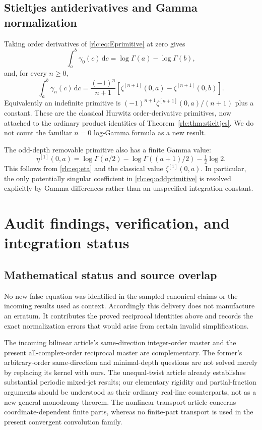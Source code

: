 \documentclass[11pt,a4paper]{article}
\numberwithin{equation}{section}
\theoremstyle{definition}\newtheorem{definition}[theorem]{Definition}
\theoremstyle{remark}\newtheorem{remark}[theorem]{Remark}
\newcommand{\dd}{\,\mathrm d}
\begin{document}
\subsection{Stieltjes antiderivatives and Gamma normalization}
Taking order derivatives of \eqref{rlc:eq:Eprimitive} at zero gives
\begin{equation}\label{rlc:eq:gammaprimitive}
 \int_a^b\gamma_0(c)\dd c=\log\Gamma(a)-\log\Gamma(b),
\end{equation}
and, for every $n\ge0$,
\begin{equation}\label{rlc:eq:stieltjesprimitive}
 \boxed{\displaystyle
 \int_a^b\gamma_n(c)\dd c
 =\frac{(-1)^n}{n+1}
       [\zeta^{[n+1]}(0,a)-\zeta^{[n+1]}(0,b)].}
\end{equation}
Equivalently an indefinite primitive is
$(-1)^{n+1}\zeta^{[n+1]}(0,a)/(n+1)$ plus a constant.
These are the classical Hurwitz order-derivative primitives, now attached
to the ordinary product identities of Theorem~\ref{rlc:thm:stieltjes}.
We do not count the familiar $n=0$ log-Gamma formula as a new result.

The odd-depth removable primitive also has a finite Gamma value:
\[
 \eta^{[1]}(0,a)=\log\Gamma(a/2)-\log\Gamma((a+1)/2)
                         -\tfrac12\log2.
\]
This follows from \eqref{rlc:eq:eta} and the classical value
$\zeta^{[1]}(0,a)$. In particular, the only potentially singular
coefficient in \eqref{rlc:eq:oddprimitive} is resolved explicitly by
Gamma differences rather than an unspecified integration constant.



\section{Audit findings, verification, and integration status}
\label{rlc:sec:audit}

\subsection{Mathematical status and source overlap}
No new false equation was identified in the sampled canonical claims or
the incoming results used as context. Accordingly this delivery does
not manufacture an erratum. It contributes the proved reciprocal
identities above and records the exact normalization errors that would
arise from certain invalid simplifications.

The incoming bilinear article's same-direction integer-order master
\cite{BMH} and the present all-complex-order reciprocal master are
complementary. The former's arbitrary-order same-direction and
minimal-depth questions are not solved merely by replacing its kernel
with ours. The unequal-twist article \cite{UTJ} already establishes
substantial periodic mixed-jet results; our elementary rigidity and
partial-fraction arguments should be understood as their ordinary
real-line counterparts, not as a new general monodromy theorem.
The nonlinear-transport article \cite{NST} concerns coordinate-dependent
finite parts, whereas no finite-part transport is used in the present
convergent convolution family.
\end{document}
